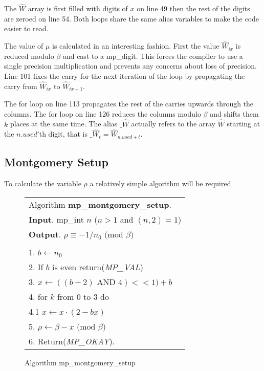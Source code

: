 \documentclass[b5paper]{book}
\begin{document}
The $\hat W$ array is first filled with digits of $x$ on line 49 then the rest of the digits are zeroed on line 54.  Both loops share
the same alias variables to make the code easier to read.  

The value of $\mu$ is calculated in an interesting fashion.  First the value $\hat W_{ix}$ is reduced modulo $\beta$ and cast to a mp\_digit.  This
forces the compiler to use a single precision multiplication and prevents any concerns about loss of precision.   Line 101 fixes the carry 
for the next iteration of the loop by propagating the carry from $\hat W_{ix}$ to $\hat W_{ix+1}$.

The for loop on line 113 propagates the rest of the carries upwards through the columns.  The for loop on line 126 reduces the columns
modulo $\beta$ and shifts them $k$ places at the same time.  The alias $\_ \hat W$ actually refers to the array $\hat W$ starting at the $n.used$'th
digit, that is $\_ \hat W_{t} = \hat W_{n.used + t}$.  

\subsection{Montgomery Setup}
To calculate the variable $\rho$ a relatively simple algorithm will be required.  

\begin{figure}[!here]
\begin{small}
\begin{center}
\begin{tabular}{l}
\hline Algorithm \textbf{mp\_montgomery\_setup}. \\
\textbf{Input}.   mp\_int $n$ ($n > 1$ and $(n, 2) = 1$) \\
\textbf{Output}.  $\rho \equiv -1/n_0 \mbox{ (mod }\beta\mbox{)}$ \\
\hline \\
1.  $b \leftarrow n_0$ \\
2.  If $b$ is even return(\textit{MP\_VAL}) \\
3.  $x \leftarrow ((b + 2) \mbox{ AND } 4) << 1) + b$ \\
4.  for $k$ from 0 to $3$ do \\
\hspace{3mm}4.1  $x \leftarrow x \cdot (2 - bx)$ \\
5.  $\rho \leftarrow \beta - x \mbox{ (mod }\beta\mbox{)}$ \\
6.  Return(\textit{MP\_OKAY}). \\
\hline
\end{tabular}
\end{center}
\end{small}
\caption{Algorithm mp\_montgomery\_setup} 
\end{figure}
\end{document}
